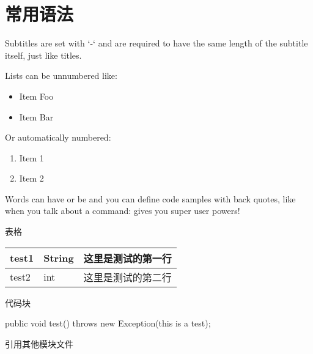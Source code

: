 \documentclass[letterpaper,10pt,english]{sphinxmanual}
\begin{document}
\section{常用语法}
\label{\detokenize{usage/quickstart:id2}}
Subtitles are set with ‘-‘ and are required to have the same length
of the subtitle itself, just like titles.

Lists can be unnumbered like:
\begin{itemize}
\item {} 
Item Foo

\item {} 
Item Bar

\end{itemize}

Or automatically numbered:
\begin{enumerate}
\item {} 
Item 1

\item {} 
Item 2

\end{enumerate}

Words can have  or be  and you can define
code samples with back quotes, like when you talk about a command: 
gives you super user powers!

表格


\begin{savenotes}\sphinxattablestart
\centering
{}
\label{\detokenize{usage/quickstart:id5}}
\sphinxaftercaption
\begin{tabulary}{\linewidth}[t]{|T|T|T|}
\hline

test1
&
String
&
这里是测试的第一行
\\
\hline
test2
&
int
&
这里是测试的第二行
\\
\hline
\end{tabulary}
\par
\sphinxattableend\end{savenotes}

代码块

%
\begin{sphinxVerbatim}[commandchars=\\\{\}]
public void test()\PYGZob{}
    throws new Exception(\PYGZdq{}this is a test\PYGZdq{});
\PYGZcb{}
\end{sphinxVerbatim}

引用其他模块文件
\end{document}
